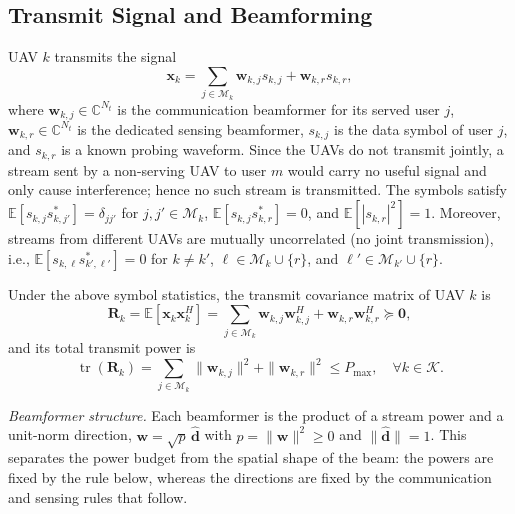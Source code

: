 \documentclass[conference]{IEEEtran}
\begin{document}

\subsection{Transmit Signal and Beamforming}\label{sec:tx}

UAV $k$ transmits the signal
\begin{equation}
\mathbf x_k=\sum_{j\in\mathcal M_k}\mathbf w_{k,j}s_{k,j}+\mathbf w_{k,r}s_{k,r},
\end{equation}
where $\mathbf w_{k,j}\in\mathbb C^{N_t}$ is the communication beamformer for its served user $j$, $\mathbf w_{k,r}\in\mathbb C^{N_t}$ is the dedicated sensing beamformer, $s_{k,j}$ is the data symbol of user $j$, and $s_{k,r}$ is a known probing waveform. Since the UAVs do not transmit jointly, a stream sent by a non-serving UAV to user $m$ would carry no useful signal and only cause interference; hence no such stream is transmitted. The symbols satisfy $\mathbb{E}[s_{k,j}s_{k,j'}^*]=\delta_{jj'}$ for $j,j'\in\mathcal M_k$, $\mathbb{E}[s_{k,j}s_{k,r}^*]=0$, and $\mathbb{E}[|s_{k,r}|^2]=1$. Moreover, streams from different UAVs are mutually uncorrelated (no joint transmission), i.e., $\mathbb{E}[s_{k,\ell}s_{k',\ell'}^*]=0$ for $k\neq k'$, $\ell\in\mathcal M_k\cup\{r\}$, and $\ell'\in\mathcal M_{k'}\cup\{r\}$.

Under the above symbol statistics, the transmit covariance matrix of UAV $k$ is
\begin{equation}
\mathbf R_k=\mathbb{E}\!\left[\mathbf x_k\mathbf x_k^H\right]
=\sum_{j\in\mathcal M_k}\mathbf w_{k,j}\mathbf w_{k,j}^H+\mathbf w_{k,r}\mathbf w_{k,r}^H\succeq\mathbf 0,
\end{equation}
and its total transmit power is
\begin{equation}
\operatorname{tr}(\mathbf R_k)=\sum_{j\in\mathcal M_k}\|\mathbf w_{k,j}\|^2+\|\mathbf w_{k,r}\|^2\le P_{\max},\quad \forall k\in\mathcal K.
\end{equation}

\emph{Beamformer structure.} Each beamformer is the product of a stream power and a unit-norm direction, $\mathbf w=\sqrt{p}\,\hat{\mathbf d}$ with $p=\|\mathbf w\|^2\ge0$ and $\|\hat{\mathbf d}\|=1$. This separates the power budget from the spatial shape of the beam: the powers are fixed by the rule below, whereas the directions are fixed by the communication and sensing rules that follow.
\end{document}
